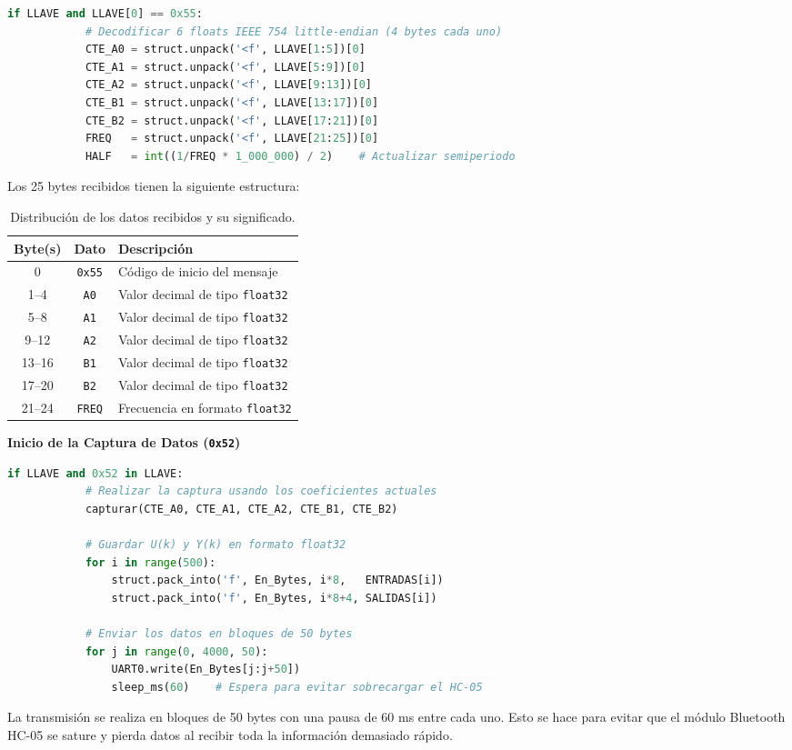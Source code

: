 \begin{lstlisting}[language=Python, caption={Decodificación de los datos de coeficientes}]
        if LLAVE and LLAVE[0] == 0x55:
            # Decodificar 6 floats IEEE 754 little-endian (4 bytes cada uno)
            CTE_A0 = struct.unpack('<f', LLAVE[1:5])[0]
            CTE_A1 = struct.unpack('<f', LLAVE[5:9])[0]
            CTE_A2 = struct.unpack('<f', LLAVE[9:13])[0]
            CTE_B1 = struct.unpack('<f', LLAVE[13:17])[0]
            CTE_B2 = struct.unpack('<f', LLAVE[17:21])[0]
            FREQ   = struct.unpack('<f', LLAVE[21:25])[0]
            HALF   = int((1/FREQ * 1_000_000) / 2)    # Actualizar semiperiodo
\end{lstlisting}

Los 25 bytes recibidos tienen la siguiente estructura:

\begin{table}[hbt!]
\centering
\begin{tabular}{|c|c|l|}
\hline
\textbf{Byte(s)} & \textbf{Dato} & \textbf{Descripción} \\ \hline
0 & \texttt{0x55} & Código de inicio del mensaje \\ \hline
1--4 & \texttt{A0} & Valor decimal de tipo \texttt{float32} \\ \hline
5--8 & \texttt{A1} & Valor decimal de tipo \texttt{float32} \\ \hline
9--12 & \texttt{A2} & Valor decimal de tipo \texttt{float32} \\ \hline
13--16 & \texttt{B1} & Valor decimal de tipo \texttt{float32} \\ \hline
17--20 & \texttt{B2} & Valor decimal de tipo \texttt{float32} \\ \hline
21--24 & \texttt{FREQ} & Frecuencia en formato \texttt{float32} \\ \hline
\end{tabular}
\caption{Distribución de los datos recibidos y su significado.}
\label{tab:trama_0x55}
\end{table}


\textbf{Inicio de la Captura de Datos (\texttt{0x52})}

\begin{lstlisting}[language=Python, caption={Ejecución de captura y envío de datos}]
        if LLAVE and 0x52 in LLAVE:
            # Realizar la captura usando los coeficientes actuales
            capturar(CTE_A0, CTE_A1, CTE_A2, CTE_B1, CTE_B2)
            
            # Guardar U(k) y Y(k) en formato float32
            for i in range(500):
                struct.pack_into('f', En_Bytes, i*8,   ENTRADAS[i])
                struct.pack_into('f', En_Bytes, i*8+4, SALIDAS[i])
                
            # Enviar los datos en bloques de 50 bytes
            for j in range(0, 4000, 50):
                UART0.write(En_Bytes[j:j+50])
                sleep_ms(60)    # Espera para evitar sobrecargar el HC-05
\end{lstlisting}

La transmisión se realiza en bloques de 50 bytes con una pausa de 60 ms entre cada uno. Esto se hace para evitar que el módulo Bluetooth HC-05 se sature y pierda datos al recibir toda la información demasiado rápido.